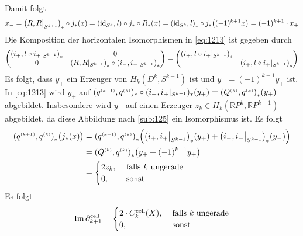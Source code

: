 Damit folgt
\begin{align*}
	 x_- = \enbrace*{R,R\big|_{S^{k+1}}}_* \circ j_* (x) = \enbrace*{\id_{S^k},l} \circ j_* \circ R_*(x) = \enbrace*{\id_{S^k},l}_* \circ j_* \enbrace*{(-1)^{k+1}x} = 
	 (-1)^{k+1}\cdot x_+    
\end{align*}
Die Komposition der horizontalen Isomorphismen in \eqref{eq:1213} ist gegeben durch
\[
	\begin{pmatrix}
		\enbrace*{i_+,l \circ i_+|_{S^{k-1}}}_* & 0 \\
		0 & \enbrace*{R,R|_{S^{k-1}}}_*  \circ \enbrace*{i_-, i_-|_{S^{k-1}}}_*
	\end{pmatrix}=
	\begin{pmatrix}
		\enbrace*{i_+, l \circ i_+|_{S^{k-1}}}_* & \\
		& \enbrace*{i_+,l \circ i_+|_{S^{k-1}}}_*
	\end{pmatrix}
\]
Es folgt, dass $y_+$ ein Erzeuger von $H_k(D^k,S^{k-1})$ ist und $y_- = (-1)^{k+1} y_+$
ist. In \eqref{eq:1213} wird $y_+$ auf $(q^\ssbrace{k+1},q^\ssbrace{k})_* \circ (i_+,i_+|_{S^{k-1}})_*(y_+) = \enbrace*{Q^\ssbrace{k},q^\ssbrace{k}}_*(y_+)$ abgebildet. 
Insbesondere wird $y_+$ auf einen Erzeuger $z_k \in H_k(\mathds{R}P^k,\mathds{R}P^{k-1})$ abgebildet, da diese Abbildung nach \ref{sub:125} ein Isomorphismus ist. Es folgt 
\begin{align*}
	\enbrace*{q^\ssbrace{k+1},q^\ssbrace{k}}_* \enbrace[\big]{j_*(x)} &= \enbrace*{q^\ssbrace{k+1},q^\ssbrace{k}}_* \enbrace*{\enbrace*{i_+,i_+\big|_{S^{k-1}}}_*(y_+) +
	\enbrace*{i_-,i_-\big|_{S^{k-1}}}_*(y_-) } \\
	&= \enbrace*{Q^\ssbrace{k},q^\ssbrace{k}}_* \enbrace*{y_+ + (-1)^{k+1} y_+} \\
	& = \begin{cases}
		2 z_k, &\text{ falls }k \text{ ungerade}\\
		0 , &\text{ sonst}
	\end{cases}  
\end{align*}
Es folgt 
\[
	\im  \partial_{k+1}^{\cell} = \begin{cases}
	2 \cdot C^{\cell}_k(X), &\text{ falls } k \text{ ungerade}\\
	0 , &\text{ sonst}
\end{cases}
\]
